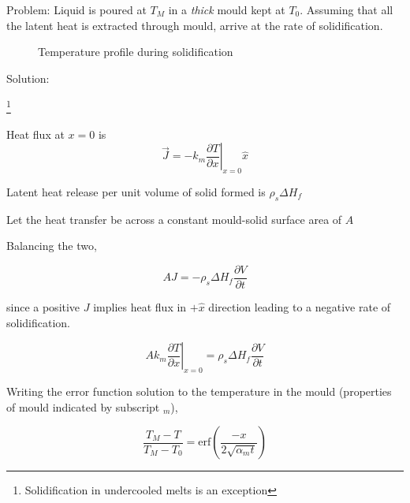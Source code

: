 Problem: Liquid is poured at $T_M$ in a {\em thick} mould kept at $T_0$.
Assuming that all the latent heat is extracted through mould, arrive at the rate
of solidification.

\begin{figure}[h]
\begin{center}
\end{center}
\caption{Temperature profile during solidification}
\label{ratesol1}
\end{figure}

Solution:


\footnote{Solidification in undercooled melts is an exception}


Heat flux at $x=0$ is 
$$ \vec{J} = -k_m \left. \frac{\partial T}{\partial x} \right|_{x=0} \hat{x}$$

Latent heat release per unit volume of solid formed is $ \rho_s \Delta H_f$

Let the heat transfer be across a constant mould-solid surface area of $A$

Balancing the two,

$$ A J = -\rho_s \Delta H_f \frac{\partial V}{\partial t} $$

since a positive $J$ implies heat flux in $+\hat{x}$ direction leading to a
negative rate of solidification. 

$$
A k_m \left. \frac{\partial T}{\partial x} \right|_{x=0} = \rho_s \Delta H_f
\frac{\partial V}{\partial t}
$$

Writing the error function solution to the temperature in the mould (properties
of mould indicated by subscript $_m$),

$$
\frac{T_M - T}{T_M - T_0} = \text{erf} (\frac{-x}{2\sqrt{\alpha_m t}})
$$

